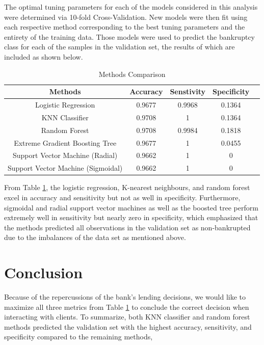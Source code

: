 \documentclass[12pt]{report}
\begin{document}
 The optimal tuning parameters for each of the models considered in this analysis were determined via 10-fold Cross-Validation. New models were then fit using each respective method corresponding to the best tuning parameters and the entirety of the training data. Those models were used to predict the bankruptcy class for each of the samples in the validation set, the results of which are included as shown below.

\begin{table}[ht]
\doublespacing
\centering
\caption{Methods Comparison}
\begin{tabular}{ccccc}
\label{modelcomp}
\textbf{Methods}          & \textbf{Accuracy} & \textbf{Senstivity} & \textbf{Specificity} \\ \hline
Logistic Regression       & 0.9677                  & 0.9968              & 0.1364              \\
KNN Classifier            & 0.9708                & 1             & 0.1364             \\
Random Forest             & 0.9708                  & 0.9984              & 0.1818              \\
Extreme Gradient Boosting Tree & 0.9677           & 1              & 0.0455\\
Support Vector Machine (Radial) & 0.9662           & 1              & 0             \\  
Support Vector Machine (Sigmoidal) & 0.9662           & 1             & 0
\end{tabular}

\end{table}
From Table \ref{modelcomp}, the logistic regression, K-nearest neighbours, and random forest excel in accuracy and sensitivity but not as well in specificity. Furthermore, sigmoidal and radial support vector machines as well as the boosted tree perform extremely well in sensitivity but nearly zero in specificity, which emphasized that the methods predicted all observations in the validation set as non-bankrupted due to the imbalances of the data set as mentioned above. 

\section{Conclusion}

Because of the repercussions of the bank's lending decisions, we would like to maximize all three metrics from Table \ref{modelcomp} to conclude the correct decision when interacting with clients. To summarize, both KNN classifier and random forest methods predicted the validation set with the highest accuracy, sensitivity, and specificity compared to the remaining methods, 
\end{document}
